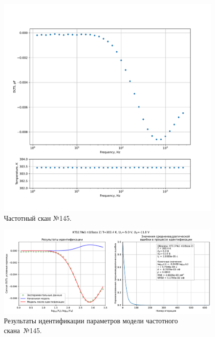 \begin{figure}[!ht]
    \centering
    \includegraphics[width=1\textwidth]{../plots/КТ117№1_п1(база 2)_2500Гц-1Гц_1пФ_+30С_-5В-11В_100мВ_20мкс_шаг_0,1.pdf}
    \caption{Частотный скан №145.}
    \label{pic:frequency_scan_145}
\end{figure}

\begin{figure}[!ht]
    \centering
    \includegraphics[width=1\textwidth]{../plots/КТ117№1_п1(база 2)_2500Гц-1Гц_1пФ_+30С_-5В-11В_100мВ_20мкс_шаг_0,1_model.pdf}
    \caption{Результаты идентификации параметров модели частотного скана~№145.}
    \label{pic:frequency_scan_model145}
\end{figure}

\pagebreak


